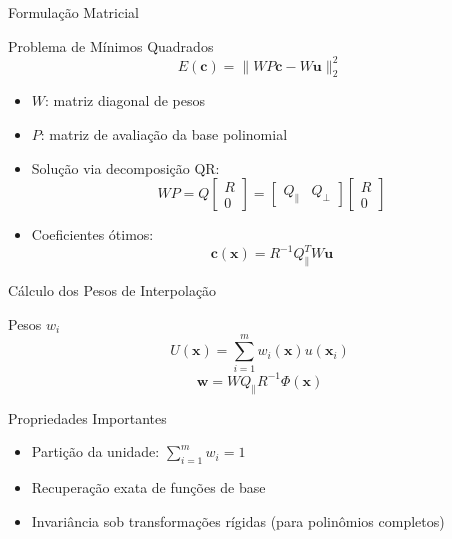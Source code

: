 \documentclass[../main/main.tex]{subfiles}
\begin{document}
\begin{frame}{Formulação Matricial}
\begin{block}{Problema de Mínimos Quadrados}
\[
E(\mathbf{c}) = \|W P \mathbf{c} - W \mathbf{u}\|_2^2
\]
\end{block}

\begin{itemize}
\item $W$: matriz diagonal de pesos
\item $P$: matriz de avaliação da base polinomial
\item Solução via decomposição QR:
\[
WP = Q \begin{bmatrix} R \\ 0 \end{bmatrix} = \begin{bmatrix} Q_\parallel & Q_\perp \end{bmatrix} \begin{bmatrix} R \\ 0 \end{bmatrix}
\]
\item Coeficientes ótimos:
\[
\mathbf{c}(\mathbf{x}) = R^{-1} Q_\parallel^T W \mathbf{u}
\]
\end{itemize}
\end{frame}

\begin{frame}{Cálculo dos Pesos de Interpolação}
\begin{block}{Pesos $w_i$}
\[
U(\mathbf{x}) = \sum_{i=1}^m w_i(\mathbf{x}) u(\mathbf{x}_i)
\]
\[
\mathbf{w} = W Q_\parallel R^{-1} \Phi(\mathbf{x})
\]
\end{block}

\begin{block}{Propriedades Importantes}
\begin{itemize}
\item Partição da unidade: $\sum_{i=1}^m w_i = 1$
\item Recuperação exata de funções de base
\item Invariância sob transformações rígidas (para polinômios completos)
\end{itemize}
\end{block}
\end{frame}
\end{document}
